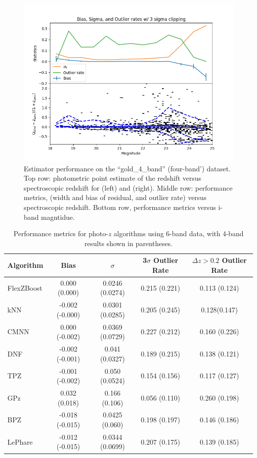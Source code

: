 \begin{figure}
    \includegraphics[width=0.45\linewidth]{figures/biweight_stats_v_mag_knn_4.png}    
    \caption{Estimator performance on the ``gold\_4\_band'' (four-band') dataset.  Top row: photometric point estimate of the redshift versus spectroscopic redshift for  (left) and  (right).   Middle row: performance metrics, (width and bias of residual, and outlier rate) versus spectroscopic redshift.    Bottom row, performance metrics versus i-band magntidue.}
    \label{fig:perf_gold_4_band}
\end{figure}

\begin{table}[ht]
\centering
\caption{Performance metrics for photo-$z$ algorithms using 6-band data, with 4-band results shown in parentheses.}
\begin{tabular}{lcccc}
\hline
\textbf{Algorithm} & \textbf{Bias} & \textbf{$\sigma$} & \textbf{3$\sigma$ Outlier Rate} & \textbf{$\Delta z>0.2$ Outlier Rate} \\
\hline
FlexZBoost & 0.000 (0.000) & 0.0246 (0.0274) & 0.215 (0.221) & 0.113 (0.124) \\
kNN        & -0.002 (-0.000) & 0.0301 (0.0285) & 0.205 (0.245) & 0.128(0.147) \\
CMNN       & 0.000 (-0.002) & 0.0369 (0.0729) & 0.227 (0.212) & 0.160 (0.226) \\
DNF        & -0.002 (-0.001) & 0.041 (0.0327) & 0.189 (0.215) & 0.138 (0.121) \\
TPZ        & -0.001 (-0.002) & 0.050 (0.0524) & 0.154 (0.156) & 0.117 (0.127) \\
GPz        & 0.032 (0.018) & 0.166 (0.106) & 0.056 (0.110) & 0.260 (0.198) \\
BPZ        & -0.018 (-0.015) & 0.0425 (0.060) & 0.198 (0.197) & 0.146 (0.186) \\
LePhare    & -0.012 (-0.015) & 0.0344 (0.0699) & 0.207 (0.175) & 0.139 (0.185) \\
\hline
\end{tabular}
\label{tab:photoz_metrics}
\end{table}




